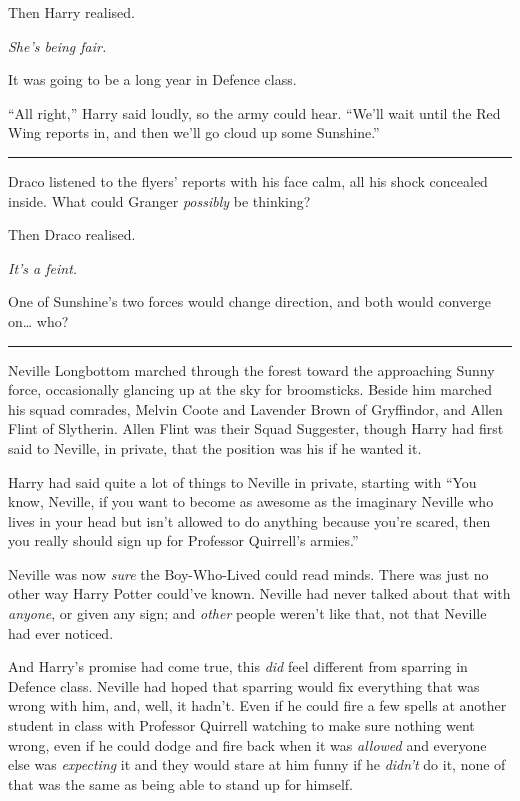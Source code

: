 Then Harry realised.

\emph{She's being fair.}

It was going to be a long year in Defence class.

``All right,'' Harry said loudly, so the army could hear. ``We'll wait
until the Red Wing reports in, and then we'll go cloud up some
Sunshine.''

\begin{center}\rule{3in}{0.4pt}\end{center}

Draco listened to the flyers' reports with his face calm, all his shock
concealed inside. What could Granger \emph{possibly} be thinking?

Then Draco realised.

\emph{It's a feint.}

One of Sunshine's two forces would change direction, and both would
converge on\ldots{} who?

\begin{center}\rule{3in}{0.4pt}\end{center}

Neville Longbottom marched through the forest toward the approaching
Sunny force, occasionally glancing up at the sky for broomsticks. Beside
him marched his squad comrades, Melvin Coote and Lavender Brown of
Gryffindor, and Allen Flint of Slytherin. Allen Flint was their Squad
Suggester, though Harry had first said to Neville, in private, that the
position was his if he wanted it.

Harry had said quite a lot of things to Neville in private, starting
with ``You know, Neville, if you want to become as awesome as the
imaginary Neville who lives in your head but isn't allowed to do
anything because you're scared, then you really should sign up for
Professor Quirrell's armies.''

Neville was now \emph{sure} the Boy-Who-Lived could read minds. There
was just no other way Harry Potter could've known. Neville had never
talked about that with \emph{anyone}, or given any sign; and
\emph{other} people weren't like that, not that Neville had ever
noticed.

And Harry's promise had come true, this \emph{did} feel different from
sparring in Defence class. Neville had hoped that sparring would fix
everything that was wrong with him, and, well, it hadn't. Even if he
could fire a few spells at another student in class with Professor
Quirrell watching to make sure nothing went wrong, even if he could
dodge and fire back when it was \emph{allowed} and everyone else was
\emph{expecting} it and they would stare at him funny if he
\emph{didn't} do it, none of that was the same as being able to stand up
for himself.

